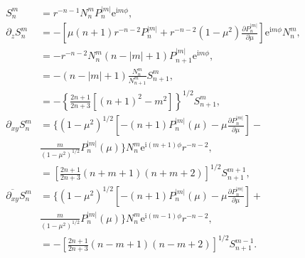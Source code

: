 \documentclass[a4paper,12pt]{article}
\newcommand{\E}{\mathrm{e}}
\newcommand{\J}{\mathrm{i}}
\begin{document}
\begin{align}
  S_{n}^{m} &= r^{-n-1}N_{n}^{m}P_{n}^{|m|}\E^{\J m\phi},\\
  \partial_{z} S_{n}^{m}
            &=
              -\left[
              \mu (n+1) r^{-n-2}P_{n}^{|m|} + r^{-n-2}(1-\mu^{2})
              \frac{\partial P_{n}^{|m|}}{\partial \mu}
              \right]\E^{\J m \phi} N_{n}^{m},\\
            &= -r^{-n-2}N_{n}^{m}(n-|m|+1)P_{n+1}^{|m|}\E^{\J m \phi},\\
            &= -(n-|m|+1)\frac{N_{n}^{m}}{N_{n+1}^{m}}S_{n+1}^{m},\\
            &=
              -\left\{
              \frac{2n+1}{2n+3}
              \left[(n+1)^{2}-m^{2}\right]
              \right\}^{1/2}S_{n+1}^{m},\\
  \partial_{xy}S_{n}^{m}
            &= 
              \biggl\{
              \left(1-\mu^{2}\right)^{1/2}
              \left[
              -(n+1)P_{n}^{|m|}(\mu)
              -\mu\frac{\partial P_{n}^{|m|}}{\partial \mu}
              \right]-\nonumber\\
            &\frac{m}{\left(1-\mu^{2}\right)^{1/2}}
              P_{n}^{|m|}(\mu)
              \biggr\}N_{n}^{m}\E^{\J(m+1)\phi}r^{-n-2},\\
            &= \left[
              \frac{2n+1}{2n+3}(n+m+1)(n+m+2)
              \right]^{1/2}S_{n+1}^{m+1},\\
  \overline{\partial_{xy}}S_{n}^{m}
            &= 
              \biggl\{
              \left(1-\mu^{2}\right)^{1/2}
              \left[
              -(n+1)P_{n}^{|m|}(\mu)
              -\mu\frac{\partial P_{n}^{|m|}}{\partial \mu}
              \right]+\nonumber\\
            &\frac{m}{\left(1-\mu^{2}\right)^{1/2}}
              P_{n}^{|m|}(\mu)
              \biggr\}N_{n}^{m}\E^{\J(m-1)\phi}r^{-n-2},\\
            &= -\left[
              \frac{2n+1}{2n+3}(n-m+1)(n-m+2)
              \right]^{1/2}S_{n+1}^{m-1}.
\end{align}
\end{document}
